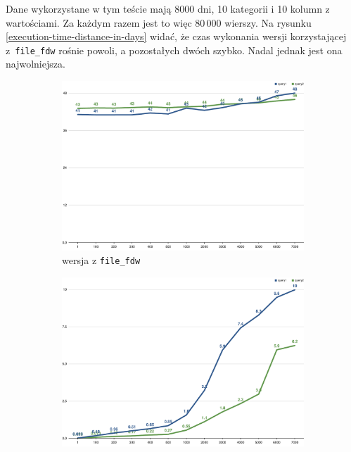 \documentclass[a4paper,11pt]{article}
\begin{document}
Dane wykorzystane w tym teście mają 8000 dni, 10 kategorii i 10 kolumn z wartościami. Za każdym razem jest to więc 80\,000 wierszy.
Na rysunku \ref{execution-time-distance-in-days} widać, że czas wykonania wersji korzystającej z~\texttt{file\_fdw} rośnie
powoli, a pozostałych dwóch szybko. Nadal jednak jest ona najwolniejsza.
\begin{figure}[h!]
    \centering
    \begin{subfigure}{.49\textwidth}
        \centering
        \includegraphics[width=\textwidth]{charts/execution-time-file-fdw-distance_in_days}
        \caption{wersja z \texttt{file\_fdw}}
    \end{subfigure}
    \hfill
    \begin{subfigure}{.49\textwidth}
        \centering
        \includegraphics[width=\textwidth]{charts/execution-time-sql-one-table-distance_in_days}

\end{subfigure}
\end{figure}
\end{document}
